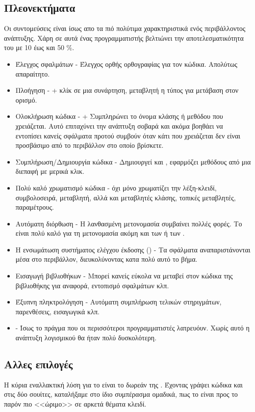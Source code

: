 \subsection*{Πλεονεκτήματα}
\quad Οι συντομεύσεις είναι ίσως απο τα πιό πολύτιμα χαρακτηριστικά ενός περιβάλλοντος ανάπτυξης. Χάρη σε αυτά ένας προγραμματιστής βελτιώνει την αποτελεσματικότητα του με 10 έως και 50 \%.
\begin{itemize}
    \item Έλεγχος σφαλμάτων - Έλεγχος ορθής ορθογραφίας για τον κώδικα. Απολύτως απαραίτητο.
    \item Πλοήγηση - \keys{\e{\ctrl}} + κλίκ σε μια συνάρτηση, μεταβλητή η τύπος για μετάβαση στον ορισμό.
    \item Ολοκλήρωση κώδικα - \keys{\e{\ctrl}} + \keys{\e{\space}} Συμπληρώνει το όνομα κλάσης ή μεθόδου που χρειάζεται. Αυτό επιταχύνει την ανάπτυξη σοβαρά και ακόμα βοηθάει να εντοπίσει κανείς σφάλματα προτού συμβούν όταν κάτι που χρειάζεται δεν είναι προσβάσιμο από το περιβάλλον στο οποίο βρίσκετε.
    \item Συμπλήρωση/Δημιουργία κώδικα - Δημιουργεί  και , εφαρμόζει μεθόδους από μια διεπαφή με μερικά κλικ.
    \item Πολύ καλό χρωματισμό κώδικα -  όχι μόνο χρωματίζει την λέξη-κλειδί, συμβολοσειρά, μεταβλητή, αλλά και μεταβλητές κλάσης, τοπικές μεταβλητές, παραμέτρους.
    \item Αυτόματη διόρθωση - Η λανθασμένη μετονομασία συμβαίνει πολλές φορές. Το  είναι πολύ καλό για τη μετονομασία ακόμη και των  ή των .
    \item Η ενσωμάτωση συστήματος ελέγχου έκδοσης () - Τα  σφάλματα αναπαριστάνονται μέσα στο περιβάλλον, διευκολύνοντας κατα πολύ αυτό το βήμα.
    \item Εισαγωγή βιβλιοθήκων - Μπορεί κανείς εύκολα να μεταβεί στον κώδικα της βιβλιοθήκης για αναφορά, εντοπισμό σφαλμάτων κλπ.
   \item Έξυπνη πληκτρολόγηση - Αυτόματη συμπλήρωση τελικών στηριγμάτων, παρενθέσεις, εισαγωγικά κλπ.
   \item {} - Ίσως το πράγμα που οι περισσότεροι προγραμματιστές λατρευόυν. Χωρίς αυτό η ανάπτυξη λογισμικού θα ήταν πολύ δυσκολότερη.
\end{itemize}

\subsection*{Αλλες επιλογές}
\quad Η κύρια εναλλακτική λύση για το  είναι το δωρεάν  της . Έχοντας γράψει κώδικα και στις δύο σουίτες, καταλήξαμε στο ίδιο συμπέρασμα ομαδικά, πως το  είναι προς το παρόν πιο <<ώριμο>> σε αρκετά θέματα κλειδί.